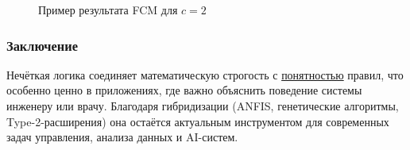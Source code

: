 \begin{figure}[h]
\centering
{}
\caption{Пример результата FCM для $c=2$}
\label{fig:fcm}
\end{figure}

\subsubsection{Заключение}

Нечёткая логика соединяет
математическую строгость с \underline{понятностью} правил,
что особенно ценно в приложениях,
где важно объяснить поведение системы инженеру или врачу.
Благодаря гибридизации (ANFIS, генетические алгоритмы,
Type-2-расширения) она остаётся актуальным
инструментом для современных задач
управления, анализа данных и AI-систем.

